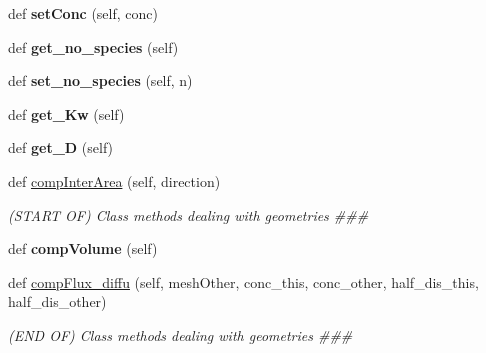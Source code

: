 \begin{DoxyCompactItemize}
\item 
def {\bfseries set\+Conc} (self, conc)\hypertarget{classmesh_1_1Mesh_ad5802c6f926a2fe0d7b885c9c687a5da}{}\label{classmesh_1_1Mesh_ad5802c6f926a2fe0d7b885c9c687a5da}

\item 
def {\bfseries get\+\_\+no\+\_\+species} (self)\hypertarget{classmesh_1_1Mesh_adf05f4be209e9171d147e66763b3f206}{}\label{classmesh_1_1Mesh_adf05f4be209e9171d147e66763b3f206}

\item 
def {\bfseries set\+\_\+no\+\_\+species} (self, n)\hypertarget{classmesh_1_1Mesh_a65d4a784781429cff8e3d20d3741c63f}{}\label{classmesh_1_1Mesh_a65d4a784781429cff8e3d20d3741c63f}

\item 
def {\bfseries get\+\_\+\+Kw} (self)\hypertarget{classmesh_1_1Mesh_a27c93b95e2185d126749d9ae335ebf34}{}\label{classmesh_1_1Mesh_a27c93b95e2185d126749d9ae335ebf34}

\item 
def {\bfseries get\+\_\+D} (self)\hypertarget{classmesh_1_1Mesh_ae6f20765f5e6a994d3d30b15c07b3a52}{}\label{classmesh_1_1Mesh_ae6f20765f5e6a994d3d30b15c07b3a52}

\item 
def \hyperlink{classmesh_1_1Mesh_a5d79b848ed97ec98bd97f92ed7989c66}{comp\+Inter\+Area} (self, direction)
\begin{DoxyCompactList}\small\item\em (S\+T\+A\+RT OF) Class methods dealing with geometries \#\#\# \end{DoxyCompactList}\item 
def {\bfseries comp\+Volume} (self)\hypertarget{classmesh_1_1Mesh_ab045aecb3cc2168b185060f7b59f3b6d}{}\label{classmesh_1_1Mesh_ab045aecb3cc2168b185060f7b59f3b6d}

\item 
def \hyperlink{classmesh_1_1Mesh_adab1ea19f28c9cb3c66539fd7e55a453}{comp\+Flux\+\_\+diffu} (self, mesh\+Other, conc\+\_\+this, conc\+\_\+other, half\+\_\+dis\+\_\+this, half\+\_\+dis\+\_\+other)
\begin{DoxyCompactList}\small\item\em (E\+ND OF) Class methods dealing with geometries \#\#\# \end{DoxyCompactList}\end{DoxyCompactItemize}
